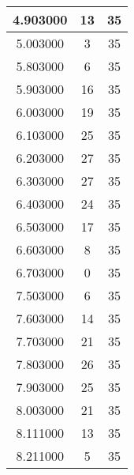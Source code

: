 \begin{longtable}[htbp]{|c|c|c|}
4.903000 & 13 & 35 \\ \hline
5.003000 & 3 & 35 \\ \hline
5.803000 & 6 & 35 \\ \hline
5.903000 & 16 & 35 \\ \hline
6.003000 & 19 & 35 \\ \hline
6.103000 & 25 & 35 \\ \hline
6.203000 & 27 & 35 \\ \hline
6.303000 & 27 & 35 \\ \hline
6.403000 & 24 & 35 \\ \hline
6.503000 & 17 & 35 \\ \hline
6.603000 & 8 & 35 \\ \hline
6.703000 & 0 & 35 \\ \hline
7.503000 & 6 & 35 \\ \hline
7.603000 & 14 & 35 \\ \hline
7.703000 & 21 & 35 \\ \hline
7.803000 & 26 & 35 \\ \hline
7.903000 & 25 & 35 \\ \hline
8.003000 & 21 & 35 \\ \hline
8.111000 & 13 & 35 \\ \hline
8.211000 & 5 & 35 \\ \hline
\end{longtable}
